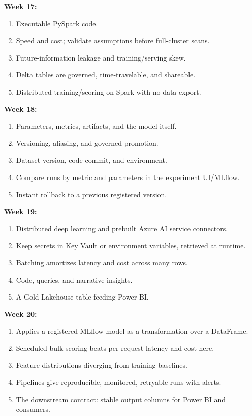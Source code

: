 \documentclass[11pt, a4paper]{article}
\begin{document}
\noindent\textbf{Week 17:}
\begin{enumerate}[leftmargin=8mm, itemsep=0pt]
    \item Executable PySpark code.
    \item Speed and cost; validate assumptions before full-cluster scans.
    \item Future-information leakage and training/serving skew.
    \item Delta tables are governed, time-travelable, and shareable.
    \item Distributed training/scoring on Spark with no data export.
\end{enumerate}

\noindent\textbf{Week 18:}
\begin{enumerate}[leftmargin=8mm, itemsep=0pt]
    \item Parameters, metrics, artifacts, and the model itself.
    \item Versioning, aliasing, and governed promotion.
    \item Dataset version, code commit, and environment.
    \item Compare runs by metric and parameters in the experiment UI/MLflow.
    \item Instant rollback to a previous registered version.
\end{enumerate}

\noindent\textbf{Week 19:}
\begin{enumerate}[leftmargin=8mm, itemsep=0pt]
    \item Distributed deep learning and prebuilt Azure AI service connectors.
    \item Keep secrets in Key Vault or environment variables, retrieved at runtime.
    \item Batching amortizes latency and cost across many rows.
    \item Code, queries, and narrative insights.
    \item A Gold Lakehouse table feeding Power BI.
\end{enumerate}

\noindent\textbf{Week 20:}
\begin{enumerate}[leftmargin=8mm, itemsep=0pt]
    \item Applies a registered MLflow model as a transformation over a DataFrame.
    \item Scheduled bulk scoring beats per-request latency and cost here.
    \item Feature distributions diverging from training baselines.
    \item Pipelines give reproducible, monitored, retryable runs with alerts.
    \item The downstream contract: stable output columns for Power BI and consumers.
\end{enumerate}
\end{document}
